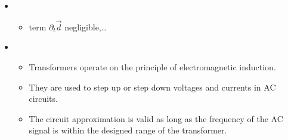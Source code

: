 \documentclass[letterpaper,10pt,english]{jupyterBook}
\begin{document}
\sphinxAtStartPar
{}
\begin{itemize}
\item {} 
\sphinxAtStartPar
{}
\begin{itemize}
\item {} 
\sphinxAtStartPar
term \(\partial_t \vec{d}\) negligible,… 

\end{itemize}

\item {} 
\sphinxAtStartPar
{}
\begin{itemize}
\item {} 
\sphinxAtStartPar
Transformers operate on the principle of electromagnetic induction.

\item {} 
\sphinxAtStartPar
They are used to step up or step down voltages and currents in AC circuits.

\item {} 
\sphinxAtStartPar
The circuit approximation is valid as long as the frequency of the AC signal is within the designed range of the transformer.

\end{itemize}

\end{itemize}
\end{document}
